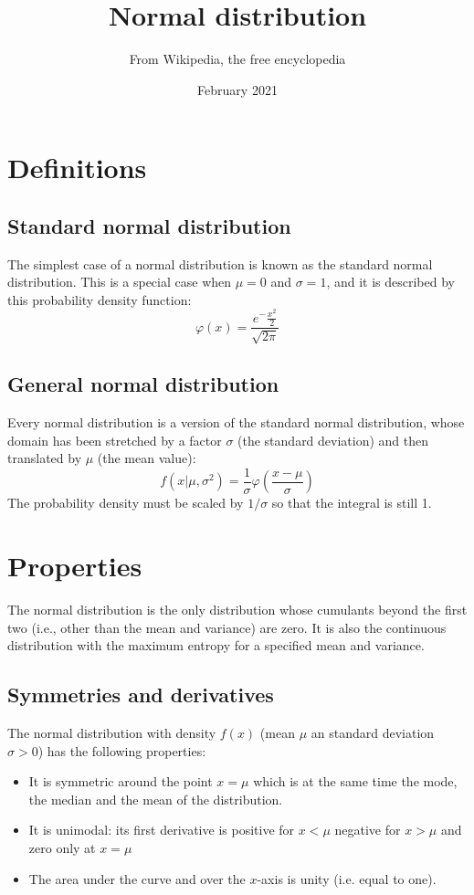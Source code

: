 \documentclass{scrartcl}
\title{Normal distribution}
\author{From Wikipedia, the free encyclopedia}
\date{February 2021}
\begin{document}
\maketitle

\tableofcontents
\newpage

\section{Definitions}
\subsection{Standard normal distribution}
The simplest case of a normal distribution is known as the standard normal distribution. This is a special case when $ \mu =0$ and $ \sigma =1$, and it is described by this probability density function:
\begin{equation}
    \varphi(x)=\frac{e^-\frac{x^2}{2}}{\sqrt{2\pi}}
\end{equation}
\subsection{General normal distribution}
Every normal distribution is a version of the standard normal distribution, whose domain has been stretched by a factor $\sigma$ (the standard deviation) and then translated by $\mu$ (the mean value): 
\begin{equation}
    f(x|\mu,\sigma^2)=\frac{1}{\sigma}\varphi(\frac{x-\mu}{\sigma})
\end{equation}
The probability density must be scaled by $1/\sigma$ so that the integral is still 1. 

\section{Properties}
The normal distribution is the only distribution whose cumulants beyond the first two (i.e., other than the mean and variance) are zero. It is also the continuous distribution with the maximum entropy for a specified mean and variance.
\subsection{Symmetries and derivatives}
The normal distribution with density $f(x)$ (mean $\mu$ an standard deviation $\sigma >0$) has the following properties:
\begin{itemize}
    \item It is symmetric around the point $x=\mu$ which is at the same time the mode, the median and the mean of the distribution.
\item It is unimodal: its first derivative is positive for $x<\mu$ negative for $x>\mu$ and zero only at $x=\mu$
\item The area under the curve and over the $x$-axis is unity (i.e. equal to one).
\end{itemize}
\end{document}
